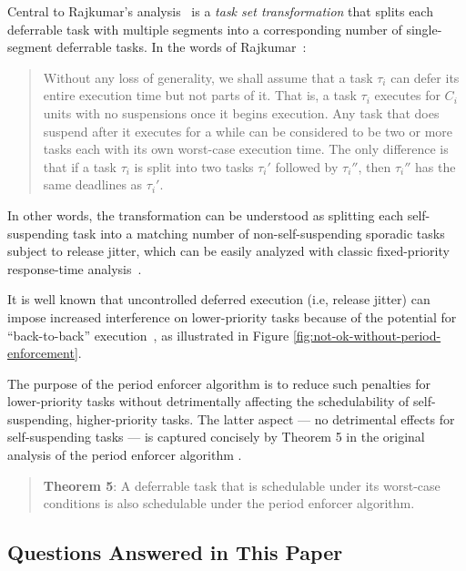 %
Central to Rajkumar's analysis~\cite{Raj:suspension1991} is a \emph{task set transformation} that splits each deferrable task with multiple segments into a corresponding number of single-segment deferrable tasks.  In the words of Rajkumar~\cite[Section 3]{Raj:suspension1991}:

\begin{quote}
	 Without any loss of generality, we shall assume that a task $\tau_i$ can defer its entire execution time but not parts of it. That is, a task $\tau_i$ executes for $C_i$ units with no suspensions once it begins execution. Any task that does suspend after it executes for a while can be considered to be two or more tasks each with its own worst-case execution time. The only difference is that if a task $\tau_i$ is split into two tasks $\tau_i'$ followed by $\tau_i''$, then $\tau_i''$ has the same deadlines as $\tau_i{{'}}$. 
\end{quote}
%
In other words, the transformation can be understood as splitting each self-suspending task into a matching number of non-self-suspending sporadic tasks subject to release jitter, which can be easily analyzed with classic fixed-priority response-time analysis~\cite{ABRTW:93}. 

It is well known that uncontrolled deferred execution (i.e, release jitter) can impose  increased interference on lower-priority tasks because of the potential for ``back-to-back'' execution~\cite{LSS:87,LSST:91,Ra:90,ABRTW:93,SLS:95}, as illustrated in Figure \ref{fig:not-ok-without-period-enforcement}. 

The purpose of the period enforcer algorithm is to reduce such penalties for lower-priority tasks without detrimentally affecting the schedulability of self-suspending, higher-priority tasks. The latter aspect --- no detrimental effects for self-suspending tasks --- is captured concisely by Theorem 5 in the original analysis of the period enforcer algorithm \cite{Raj:suspension1991}.
\begin{quote}
{\bf Theorem 5}: A deferrable task that is schedulable under its worst-case conditions is also schedulable under the period enforcer algorithm.  \cite{Raj:suspension1991}
\end{quote}

\subsection{Questions Answered in This Paper}
\label{sec:questions}

